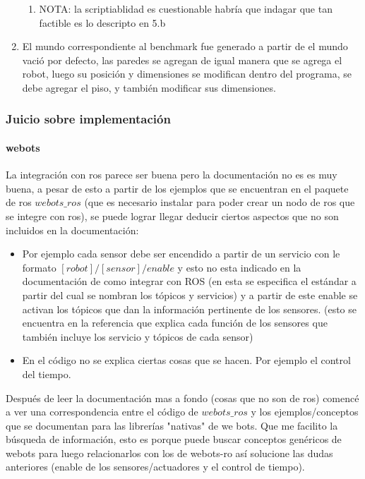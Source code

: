 \begin{enumerate}
\begin{enumerate}
    \item NOTA: la scriptiablidad es cuestionable habría que indagar que tan factible es lo descripto en 5.b 
  \end{enumerate}
  \item El mundo correspondiente al benchmark fue generado a partir de el mundo vació por defecto, las paredes se agregan de igual manera que se agrega el robot, luego su posición y dimensiones se modifican dentro del programa, se debe agregar el piso, y también modificar sus dimensiones.
\end{enumerate}

\subsubsection{Juicio sobre implementación}
\paragraph{webots} La integración con ros parece ser buena pero la documentación no es es muy buena, a pesar de esto a partir de los ejemplos que se encuentran en el paquete de ros $webots\_ros$ (que es necesario instalar para poder crear un nodo de ros que se integre con ros), se puede lograr llegar deducir ciertos aspectos que no son incluidos en la documentación:
\begin{itemize}
  \item Por ejemplo cada sensor debe ser encendido a partir de un servicio con le formato $[robot]/[sensor]/enable$ y esto no esta indicado en la documentación de como integrar con ROS (en esta se especifica el estándar a partir del cual se nombran los tópicos y servicios) y a partir de este enable se activan los tópicos que dan la información pertinente de los sensores. (esto se encuentra en la referencia que explica cada función de los sensores que también incluye los servicio y tópicos de cada sensor)
  \item En el código no se explica ciertas cosas que se hacen. Por ejemplo el control del tiempo.
\end{itemize}


Después de leer la documentación mas a fondo (cosas que no son de ros) comencé a ver una correspondencia entre el código de $webots\_ros$ y los ejemplos/conceptos que se documentan para las librerías "nativas" de we bots. Que me facilito la búsqueda de información, esto es porque puede buscar conceptos genéricos de webots para luego relacionarlos con los de webots-ro así solucione las dudas anteriores (enable de los sensores/actuadores y el control de tiempo).


